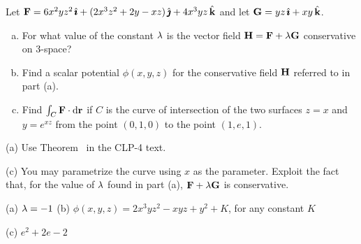 \begin{question}
 Let  $\mathbf{F} = 6x^2yz^2\,\hat{\pmb{\imath}} + (2x^3z^2 + 2y - xz)\,\hat{\pmb{\jmath}} 
+ 4x^3yz\,\hat{\mathbf{k}}$ and let $\mathbf{G} = yz\,\hat{\pmb{\imath}} + xy\,\hat{\mathbf{k}}$. 
\begin{enumerate}[(a)]
\item 
For what value of the constant $\lambda$ is the vector field 
$\mathbf{H} = \mathbf{F} +  \lambda\mathbf{G}$ conservative on 3-space? 
\item
Find a scalar potential $\phi(x,y,z)$ for the conservative field $\mathbf{H}$ referred to in part (a). 
\item 
Find   $\int_C\mathbf{F}\cdot \mathrm{d}\mathbf{r}$ if $C$ is the curve of intersection of the two surfaces $z = x$ and $y = e^{xz}$ from the point $(0, 1, 0)$ to 
the point $(1, e, 1)$.
\end{enumerate} 
\end{question}

\begin{hint} 
(a) Use Theorem~ in the CLP-4 text.

(c) You may parametrize the curve using $x$ as the parameter.
Exploit the fact that, for the value of $\lambda$ found in part (a), $\mathbf{F}+\lambda \mathbf{G}$ is conservative.
\end{hint}

\begin{answer} 
(a) $\lambda=-1$\qquad
(b) $\phi(x,y,z)=2x^3yz^2-xyz+y^2+K$, for any constant $K$

(c) $e^2+2e-2$
\end{answer}


